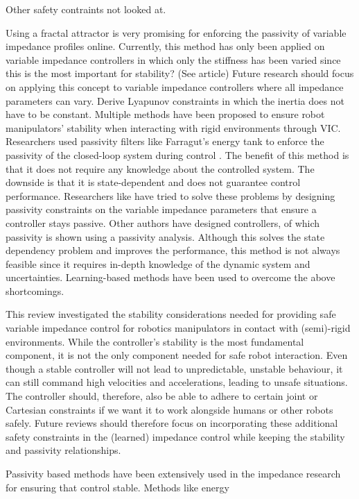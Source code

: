 Other safety contraints not looked at.


Using a fractal attractor is very promising for enforcing the passivity of variable impedance profiles online. Currently, this method has only been applied on variable impedance controllers in which only the stiffness has been varied since this is the most important for stability? (See article) Future research should focus on applying this concept to variable impedance controllers where all impedance parameters can vary.
Derive Lyapunov constraints in which the inertia does not have to be constant.
Multiple methods have been proposed to ensure robot manipulators' stability when interacting with rigid environments through VIC. Researchers used passivity filters like Farragut's energy tank to enforce the passivity of the closed-loop system during control \cite{ferragutiTankbasedApproachImpedance2013}. The benefit of this method is that it does not require any knowledge about the controlled system. The downside is that it is state-dependent and does not guarantee control performance. Researchers like \cite{kronanderStabilityConsiderationsVariable2016}have tried to solve these problems by designing passivity constraints on the variable impedance parameters that ensure a controller stays passive. Other authors have designed controllers, of which passivity is shown using a passivity analysis. Although this solves the state dependency problem and improves the performance, this method is not always feasible since it requires in-depth knowledge of the dynamic system and uncertainties. Learning-based methods have been used to overcome the above shortcomings.

This review investigated the stability considerations needed for providing safe variable impedance control for robotics manipulators in contact with (semi)-rigid environments. While the controller's stability is the most fundamental component, it is not the only component needed for safe robot interaction. Even though a stable controller will not lead to unpredictable, unstable behaviour, it can still command high velocities and accelerations, leading to unsafe situations. The controller should, therefore, also be able to adhere to certain joint or Cartesian constraints if we want it to work alongside humans or other robots safely. Future reviews should therefore focus on incorporating these additional safety constraints in the (learned) impedance control while keeping the stability and passivity relationships.

Passivity based methods have been extensively used in the impedance research for ensuring that control stable. Methods like energy

